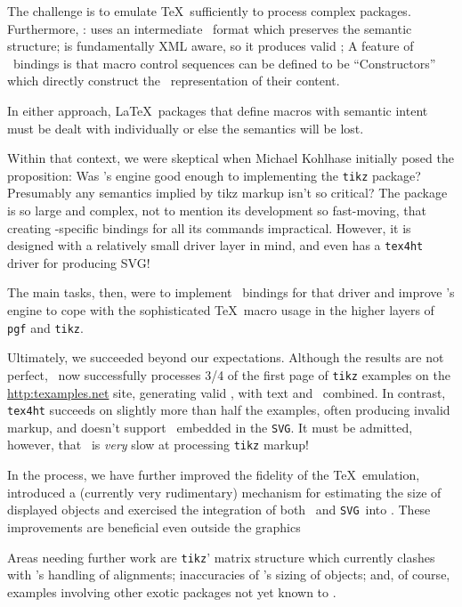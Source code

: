\documentclass{llncs}
\def\SVG{\texttt{SVG}\xspace}
\begin{document}
The challenge is to emulate \TeX\ sufficiently
to process complex packages.
Furthermore, \LaTeXML:
uses an intermediate \XML\ format which preserves
the semantic structure;
is fundamentally XML aware, so it produces valid \XML;
A feature of \LaTeXML\ bindings is that macro
control sequences can be defined to be ``Constructors''
which directly construct the \XML\ representation
of their content.

In either approach, \LaTeX\ packages that define
macros with semantic intent must be dealt with
individually or else the semantics will be lost.

Within that context, we were skeptical when Michael Kohlhase
initially posed the proposition: Was \LaTeXML's engine good
enough to implementing the \texttt{tikz} package?
Presumably any semantics implied by tikz markup isn't so critical?
The package is so large and complex, not to mention
its development so fast-moving, that creating \LaTeXML-specific
bindings for all its commands impractical.  However,
it is designed with a relatively small driver layer
in mind, and even has a \texttt{tex4ht} driver for producing SVG!

The main tasks, then, were to implement \LaTeXML\ bindings
for that driver and improve \LaTeXML's engine to cope
with the sophisticated \TeX\ macro usage in the higher
layers of \texttt{pgf} and \texttt{tikz}.

Ultimately, we succeeded beyond our expectations.
Although the results are not perfect,
\LaTeXML\ now successfully processes 3/4 of the
first page of \texttt{tikz} examples on the
\url{http:texamples.net} site, generating valid
, with text and \MathML\ combined.
In contrast, \texttt{tex4ht} succeeds on slightly more
than half the examples, often producing invalid markup,
and doesn't support \MathML\ embedded in the \SVG.
It must be admitted, however, that \LaTeXML\ is \emph{very}
slow at processing \texttt{tikz} markup!

In the process, we have further improved the
fidelity of the \TeX\ emulation, introduced
a (currently very rudimentary) mechanism for estimating
the size of displayed objects and exercised the
integration of both \MathML\ and \SVG\ into \HTML.
These improvements are beneficial even outside the graphics

Areas needing further work are \texttt{tikz}' matrix
structure which currently clashes with \LaTeXML's handling
of alignments; inaccuracies of \LaTeXML's sizing of objects;
and, of course, examples involving other exotic packages
not yet known to \LaTeXML.
\end{document}
